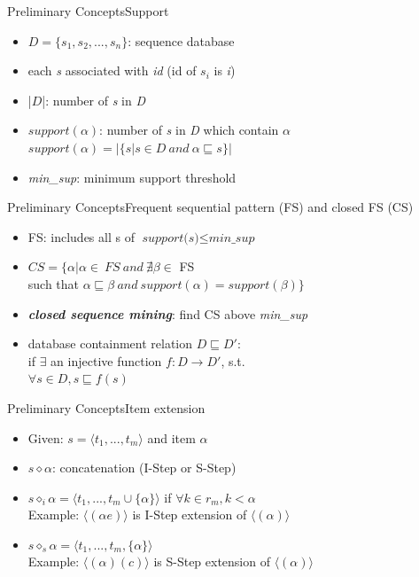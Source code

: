 \documentclass[12pt]{beamer}
\begin{document}
\begin{frame}{Preliminary Concepts}{Support}
\begin{itemize}
\item $\textit{D} = \{ s_1,s_2,...,s_n \}$: sequence database
\item each \textit{s} associated with \textit{id} (id of $s_i$ is \textit{i})
\item |$\textit{D}$|: number of \textit{s} in \textit{D}
\item $support(\alpha)$: number of \textit{s} in \textit{D} which contain $\alpha$\\
$support(\alpha) = |\{ s|s \in D~and~\alpha \sqsubseteq s\}|$
\item \textit{min\_sup}: minimum support threshold
\end{itemize}
\end{frame}

\begin{frame}{Preliminary Concepts}{Frequent sequential pattern (FS) and closed FS (CS)}
\begin{itemize}
\item FS: includes all s of $\textit{support(s)} \leq \textit{min\_sup}$
\item $CS = \{ \alpha|\alpha \in~FS~and~\nexists\beta \in$ FS\\such that $\alpha \sqsubseteq \beta~and~support(\alpha) = support(\beta)\}$
\item {\bf {\it closed sequence mining}}: find CS above {\it min\_sup}
\item database containment relation $D \sqsubseteq D'$:\\if $\exists$ an injective function $f : D \rightarrow D'$, s.t.\\
$\forall s \in D, s \sqsubseteq f(s)$
\end{itemize}
\end{frame}

\begin{frame}{Preliminary Concepts}{Item extension}
\begin{itemize}
\item Given: $s = \langle t_1,...,t_m \rangle$ and item $\alpha$
\item $s \diamond \alpha$: concatenation (I-Step or S-Step)
\item $s \diamond_i \alpha = \langle t_1,...,t_m \cup \{ \alpha \} \rangle$ if $\forall k \in r_m, k < \alpha$\\ Example: $\langle (\alpha e) \rangle$ is I-Step extension of $\langle (\alpha) \rangle$
\item $s \diamond_s \alpha = \langle t_1,...,t_m,\{ \alpha \} \rangle$\\ Example: $\langle (\alpha)(c) \rangle$ is S-Step extension of $\langle (\alpha) \rangle$
\end{itemize}
\end{frame}
\end{document}
